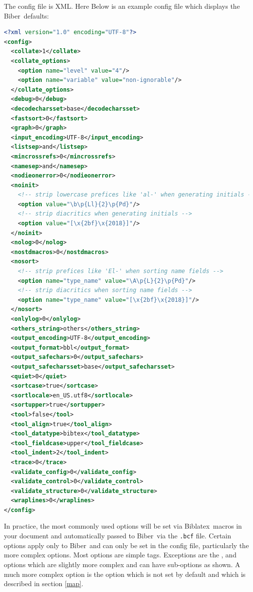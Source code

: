 \documentclass{ltxdockit}
\newcommand*{\biber}{Biber\xspace}
\newcommand*{\biblatex}{Biblatex\xspace}
\begin{document}
\noindent The config file is XML. Here Below is
an example config file which displays the \biber\ defaults:

\begin{lstlisting}[language=xml]
<?xml version="1.0" encoding="UTF-8"?>
<config>
  <collate>1</collate>
  <collate_options>
    <option name="level" value="4"/>
    <option name="variable" value="non-ignorable"/>
  </collate_options>
  <debug>0</debug>
  <decodecharsset>base</decodecharsset>
  <fastsort>0</fastsort>
  <graph>0</graph>
  <input_encoding>UTF-8</input_encoding>
  <listsep>and</listsep>
  <mincrossrefs>0</mincrossrefs>
  <namesep>and</namesep>
  <nodieonerror>0</nodieonerror>
  <noinit>
    <!-- strip lowercase prefices like 'al-' when generating initials -->
    <option value="\b\p{Ll}{2}\p{Pd}"/>
    <!-- strip diacritics when generating initials -->
    <option value="[\x{2bf}\x{2018}]"/>
  </noinit>
  <nolog>0</nolog>
  <nostdmacros>0</nostdmacros>
  <nosort>
    <!-- strip prefices like 'El-' when sorting name fields -->
    <option name="type_name" value="\A\p{L}{2}\p{Pd}"/>
    <!-- strip diacritics when sorting name fields -->
    <option name="type_name" value="[\x{2bf}\x{2018}]"/>
  </nosort>
  <onlylog>0</onlylog>
  <others_string>others</others_string>
  <output_encoding>UTF-8</output_encoding>
  <output_format>bbl</output_format>
  <output_safechars>0</output_safechars>
  <output_safecharsset>base</output_safecharsset>
  <quiet>0</quiet>
  <sortcase>true</sortcase>
  <sortlocale>en_US.utf8</sortlocale>
  <sortupper>true</sortupper>
  <tool>false</tool>
  <tool_align>true</tool_align>
  <tool_datatype>bibtex</tool_datatype>
  <tool_fieldcase>upper</tool_fieldcase>
  <tool_indent>2</tool_indent>
  <trace>0</trace>
  <validate_config>0</validate_config>
  <validate_control>0</validate_control>
  <validate_structure>0</validate_structure>
  <wraplines>0</wraplines>
</config>
\end{lstlisting}

\noindent In practice, the most commonly used options will be set via
\biblatex\ macros in your document and automatically passed to \biber\
via the \verb+.bcf+ file. Certain options apply only to \biber\ and can
only be set in the config file, particularly the more complex
options. Most options are simple tags. Exceptions are the
,  and  options which are slightly
more complex and can have sub-options as shown. A much more complex
option is the \opt{sourcemap} option which is not set by default and
which is described in section \ref{map}.
\end{document}
